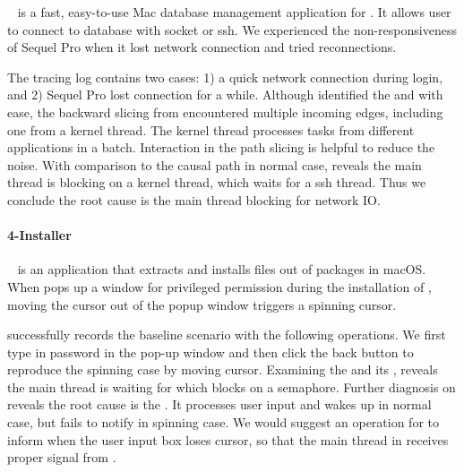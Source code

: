 ~\cite{SequelPro} is a fast, easy-to-use Mac database management
application for . It allows user to connect to database with socket or ssh.
We experienced the non-responsiveness of Sequel Pro when it lost network
connection and tried reconnections.

The tracing log contains two cases: 1) a quick network connection during login,
and 2) Sequel Pro lost connection for a while. Although \xxx identified the
\spinningnode and \similarnode with ease, the backward slicing from \similarnode
encountered multiple incoming edges, including one from a kernel thread.
The kernel thread processes tasks from different applications in a batch.
Interaction in the path slicing is helpful to reduce the noise. With comparison
to the causal path in normal case, \xxx reveals the main thread is blocking on a
kernel thread, which waits for a ssh thread. Thus we conclude the root cause is
the main thread blocking for network IO.

\paragraph{4-Installer}

~\cite{Installer} is an application that extracts and installs
files out of  packages in macOS. When  pops up a window
for privileged permission during the installation of ,
moving the cursor out of the popup window triggers a spinning cursor.

\xxx successfully records the baseline scenario with the following operations.
We first type in password in the pop-up window and then click the back button to
reproduce the spinning case by moving cursor. Examining the \spinningnode and
its \similarnode, \xxx reveals the main thread is waiting for  which
blocks on a semaphore. Further diagnosis on  reveals the root cause
is the . It processes user input and wakes up  in
normal case, but fails to notify  in spinning case. We would suggest
an operation for  to inform  when the user input box
loses cursor, so that the main thread in  receives proper signal
from .

